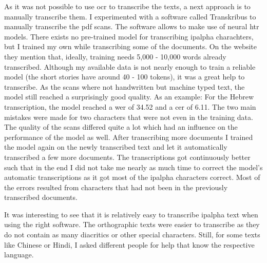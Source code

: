As it was not possible to use \ac{ocr} to transcribe the texts, a next approach is to manually transcribe them. I experimented with a software called Transkribus to manually transcribe the pdf scans. The software allows to make use of neural \ac{htr} models. There exists no pre-trained model for transcribing \ac{ipalpha} charachters, but I trained my own while transcribing some of the documents. On the website they mention that, ideally, training needs 5,000 - 10,000 words already transcribed. Although my available data is not nearly enough to train a reliable model (the short stories have around 40 - 100 tokens), it was a great help to transcribe. As the scans where not handwritten but machine typed text, the model still reached a surprisingly good quality. As an example: For the Hebrew transcription, the model reached a \ac{wer} of 34.52 and a \ac{cer} of 6.11. The two main mistakes were made for two characters that were not even in the training data. The quality of the scans differed quite a lot which had an influence on the performance of the model as well. After transcribing more documents I trained the model again on the newly transcribed text and let it automatically transcribed a few more documents. The transcriptions got continuously better such that in the end I did not take me nearly as much time to correct the model's automatic transcriptions as it got most of the \ac{ipalpha} characters correct. Most of the errors resulted from characters that had not been in the previously transcribed documents. 

It was interesting to see that it is relatively easy to transcribe \ac{ipalpha} text when using the right software. The orthographic texts were easier to transcribe as they do not contain as many diacritics or other special characters. Still, for some texts like Chinese or Hindi, I asked different people for help that know the respective language.

